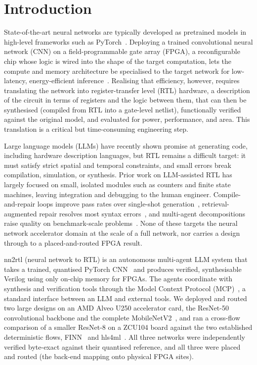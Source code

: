 \documentclass[acmtog,authorversion]{acmart}
\begin{document}
\section{Introduction}\label{sec:intro}
State-of-the-art neural networks are typically developed as pretrained models in high-level frameworks such as PyTorch~\cite{paszke2019}. Deploying a trained convolutional neural network (CNN) on a field-programmable gate array (FPGA), a reconfigurable chip whose logic is wired into the shape of the target computation, lets the compute and memory architecture be specialised to the target network for low-latency, energy-efficient inference~\cite{petrica2020, blott2018finnr}. Realising that efficiency, however, requires translating the network into register-transfer level (RTL) hardware, a description of the circuit in terms of registers and the logic between them, that can then be synthesised (compiled from RTL into a gate-level netlist), functionally verified against the original model, and evaluated for power, performance, and area. This translation is a critical but time-consuming engineering step.

Large language models (LLMs) have recently shown promise at generating code, including hardware description languages, but RTL remains a difficult target: it must satisfy strict spatial and temporal constraints, and small errors break compilation, simulation, or synthesis. Prior work on LLM-assisted RTL has largely focused on small, isolated modules such as counters and finite state machines, leaving integration and debugging to the human engineer. Compile-and-repair loops improve pass rates over single-shot generation~\cite{thakur2024autochip}, retrieval-augmented repair resolves most syntax errors~\cite{tsai2024rtlfixer}, and multi-agent decompositions raise quality on benchmark-scale problems~\cite{ho2025verilogcoder, wang2025rtlsquad, zhao2024mage}. None of these targets the neural network accelerator domain at the scale of a full network, nor carries a design through to a placed-and-routed FPGA result.

nn2rtl (neural network to RTL) is an autonomous multi-agent LLM system that takes a trained, quantised PyTorch CNN~\cite{paszke2019} and produces verified, synthesisable Verilog using only on-chip memory for FPGAs. The agents coordinate with synthesis and verification tools through the Model Context Protocol (MCP)~\cite{anthropic2025mcp}, a standard interface between an LLM and external tools. We deployed and routed two large designs on an AMD Alveo U250 accelerator card, the ResNet-50~\cite{he2016} convolutional backbone and the complete MobileNetV2~\cite{sandler2018}, and ran a cross-flow comparison of a smaller ResNet-8 on a ZCU104 board against the two established deterministic flows, FINN~\cite{umuroglu2017finn} and hls4ml~\cite{schulte2026hls4ml, duarte2018hls4ml}. All three networks were independently verified byte-exact against their quantised reference, and all three were placed and routed (the back-end mapping onto physical FPGA sites).
\end{document}
